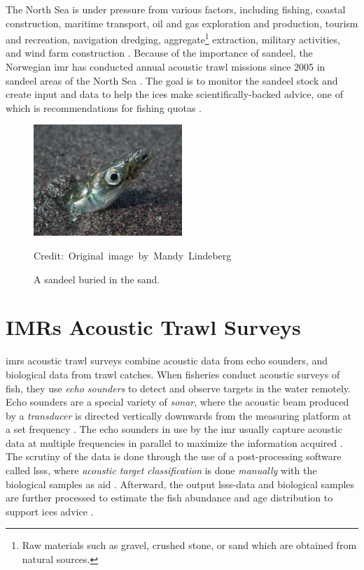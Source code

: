     The North Sea is under pressure from various factors, including fishing, coastal construction, maritime transport, oil and gas exploration and production, tourism and recreation, navigation dredging, aggregate\footnote{Raw materials such as gravel, crushed stone, or sand which are obtained from natural sources.} extraction, military activities, and wind farm construction \cite{ICES2021}. Because of the importance of sandeel, the Norwegian \gls{imr} has conducted annual acoustic trawl missions since 2005 in sandeel areas of the North Sea \cite{johnsen2017collective}. The goal is to monitor the sandeel stock and create input and data to help the \gls{ices} make scientifically-backed advice, one of which is recommendations for fishing quotas \cite{sizedependentfreqrespons2009johnsen}. 
    
    \begin{figure}[H] 
        \centering

        \includegraphics[width=0.5\textwidth]{figures/Ammodytes_hexapterus.jpg} 

        \caption[Sandeel]{A sandeel buried in the sand.}
        \medskip 
        \hspace*{15pt}\hbox{\scriptsize Credit: Original image by Mandy Lindeberg \cite{sandeel_image}}
        \label{sandeel_image}
    \end{figure}

\section{IMRs Acoustic Trawl Surveys}
    \gls{imr}s acoustic trawl surveys combine acoustic data from echo sounders, and biological data from trawl catches. When fisheries conduct acoustic surveys of fish, they use \textit{echo sounders} to detect and observe targets in the water remotely. Echo sounders are a special variety of \textit{sonar}, where the acoustic beam produced by a \textit{transducer} is directed vertically downwards from the measuring platform at a set frequency \cite{simmonds2008fisheries}. The echo sounders in use by the \gls{imr} usually capture acoustic data at multiple frequencies in parallel to maximize the information acquired \cite{korneliussen2018acoustic}. The scrutiny of the data is done through the use of a post-processing software called \gls{lsss}, where \textit{acoustic target classification} is done \textit{manually} with the biological samples as aid \cite{korneliussen2006large}. Afterward, the output \gls{lsss}-data and biological samples are further processed to estimate the fish abundance and age distribution to support \gls{ices} advice \cite{johnsen2019stox}. 

